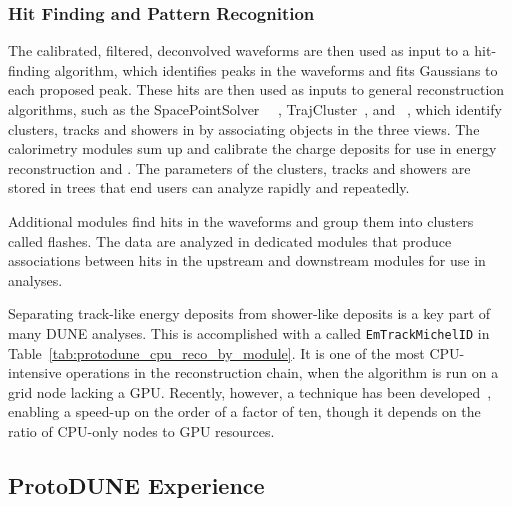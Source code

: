 \documentclass[../main-v1.tex]{subfiles}
\begin{document}
\subsubsection{Hit Finding and Pattern Recognition}

The calibrated, filtered, deconvolved waveforms are then used as input to a hit-finding algorithm, which identifies peaks in the waveforms and fits Gaussians to each proposed peak.  These hits are then used as inputs to general reconstruction algorithms, such as the SpacePointSolver~\cite{DUNE:2020ypp} ~\cite{Marshall:2015rfa}, TrajCluster~\cite{ref:trajcluster}, and ~\cite{ref:PMA}, which identify clusters, tracks and showers in \threed by associating objects in the three \twod views.  The calorimetry modules sum up and calibrate the charge deposits for use in energy reconstruction and .  The parameters of the clusters, tracks and showers are stored in  trees that end users can analyze rapidly and repeatedly.

Additional modules find hits in the  waveforms and group them into clusters called flashes.  The  data are analyzed in dedicated modules that produce associations between hits in the upstream and downstream  modules for use in analyses.

Separating track-like energy deposits from shower-like deposits is a key part of many DUNE analyses.  This is accomplished with a  called {\tt EmTrackMichelID} in Table~\ref{tab:protodune_cpu_reco_by_module}.  It is one of the most CPU-intensive operations in the  reconstruction chain, when the algorithm is run on a grid node lacking a GPU.  Recently, however, a  technique has been developed~\cite{Wang:2020fjr}, enabling a speed-up on the order of a factor of ten, though it depends on the ratio of CPU-only nodes to GPU resources.


\subsection{ProtoDUNE Experience}
\end{document}
